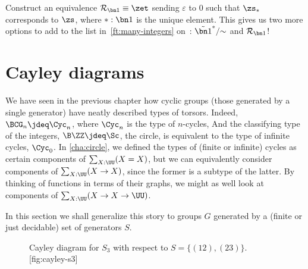 \begin{xca}
  Construct an equivalence $\mathcal R_{\bn 1} \equiv \zet$
  sending $\varepsilon$ to $0$ such that $\zs_*$ corresponds to $\zs$,
  where $*:\bn 1$ is the unique element.
  This gives us two more options to add to the list in~\cref{ft:many-integers}
  on~: $\tilde{\bn 1}^*/{\sim}$ and $\mathcal R_{\bn 1}$!
\end{xca}

\section{Cayley diagrams}
\label{sec:cayley-diagrams}

We have seen in the previous chapter how cyclic groups
(those generated by a single generator)
have neatly described types of torsors.
Indeed, $\BCG_n \jdeq \Cyc_n$, where $\Cyc_n$ is the type of $n$-cycles,
And the classifying type of the integers, $\B\ZZ\jdeq\Sc$, \ie the circle,
is equivalent to the type of infinite cycles, $\Cyc_0$.
In \cref{cha:circle}, we defined the types of (finite or infinite)
cycles as certain components of $\sum_{X:\UU}(X=X)$,
but we can equivalently consider components of $\sum_{X:\UU}(X\to X)$,
since the former is a subtype of the latter.
By thinking of functions in terms of their graphs,
we might as well look at components of $\sum_{X:\UU}(X \to X \to \UU)$.

In this section we shall generalize this story
to groups $G$ generated by a
(finite or just decidable)
set of generators $S$.


\begin{figure}
  \begin{sidecaption}%
    {Cayley diagram for $S_3$ with respect to $S = \{(12),(23)\}$.}[fig:cayley-s3]
  \centering
  \end{sidecaption}
\end{figure}

